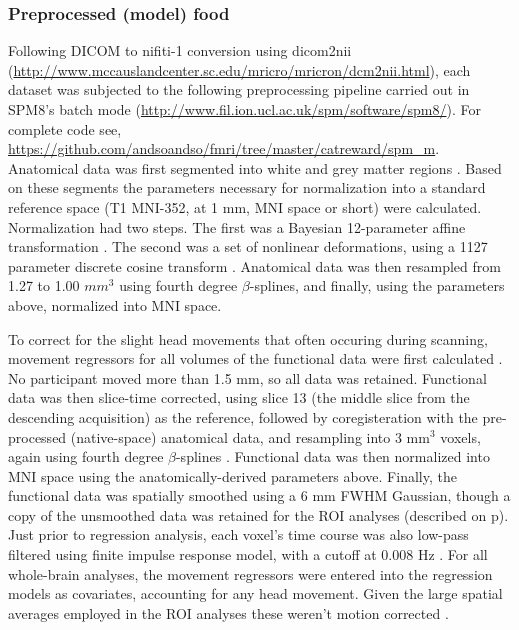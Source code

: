 \documentclass[doc,12pt]{apa}        %
\begin{document}
\subsubsection{Preprocessed (model) food}
\label{subsub:preprocessed}
Following DICOM to nifiti-1 conversion using dicom2nii (\url{http://www.mccauslandcenter.sc.edu/mricro/mricron/dcm2nii.html}), each dataset was subjected to the following preprocessing pipeline carried out in SPM8's batch mode (\url{http://www.fil.ion.ucl.ac.uk/spm/software/spm8/}).  For complete code see, \url{https://github.com/andsoandso/fmri/tree/master/catreward/spm\_m}.  Anatomical data was first segmented into white and grey matter regions \cite{Collignon:1995p9347}.  Based on these segments the parameters necessary for normalization into a standard reference space (T1 MNI-352, at 1 mm, MNI space or short) were calculated. Normalization had two steps.  The first was a Bayesian 12-parameter affine transformation \cite{Ashburner:1997p9348}.  The second was a set of nonlinear deformations, using a 1127 parameter discrete cosine transform \cite{Ashburner:1999p9350}.  Anatomical data was then resampled from 1.27 to 1.00 $mm^3$ using fourth degree $\beta$-splines, and finally, using the parameters above, normalized into MNI space.

To correct for the slight head movements that often occuring during scanning, movement regressors for all volumes of the functional data were first calculated \cite{Ashburner:1999p9350}.  No participant moved more than 1.5 mm, so all data was retained.  Functional data was then slice-time corrected, using slice 13 (the middle slice from the descending acquisition) as the reference, followed by coregisteration with the pre-processed (native-space) anatomical data, and resampling into 3 mm$^3$ voxels, again using fourth degree $\beta$-splines \cite{Collignon:1995p9347}.  Functional data was then normalized into MNI space using the anatomically-derived parameters above.  Finally, the functional data was spatially smoothed using a 6 mm FWHM Gaussian, though a copy of the unsmoothed data was retained for the ROI analyses (described on p\pageref{sub:regoins}).  Just prior to regression analysis, each voxel's time course was also low-pass filtered using finite impulse response model, with a cutoff at 0.008 Hz \cite{Kruggel:1999p9351}.  For all whole-brain analyses, the movement regressors were entered into the regression models as covariates, accounting for any head movement.  Given the large spatial averages employed in the ROI analyses these weren't motion corrected \cite{Poldrack:2007p8572}.
\end{document}
